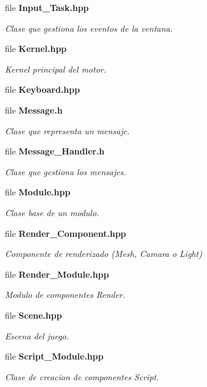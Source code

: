 \begin{DoxyCompactItemize}
file \textbf{ Input\+\_\+\+Task.\+hpp}
\begin{DoxyCompactList}\small\item\em Clase que gestiona los eventos de la ventana. \end{DoxyCompactList}\item 
file \textbf{ Kernel.\+hpp}
\begin{DoxyCompactList}\small\item\em Kernel principal del motor. \end{DoxyCompactList}\item 
file \textbf{ Keyboard.\+hpp}
\item 
file \textbf{ Message.\+h}
\begin{DoxyCompactList}\small\item\em Clase que representa un mensaje. \end{DoxyCompactList}\item 
file \textbf{ Message\+\_\+\+Handler.\+h}
\begin{DoxyCompactList}\small\item\em Clase que gestiona los mensajes. \end{DoxyCompactList}\item 
file \textbf{ Module.\+hpp}
\begin{DoxyCompactList}\small\item\em Clase base de un modulo. \end{DoxyCompactList}\item 
file \textbf{ Render\+\_\+\+Component.\+hpp}
\begin{DoxyCompactList}\small\item\em Componente de renderizado (Mesh, Camara o Light) \end{DoxyCompactList}\item 
file \textbf{ Render\+\_\+\+Module.\+hpp}
\begin{DoxyCompactList}\small\item\em Modulo de componentes Render. \end{DoxyCompactList}\item 
file \textbf{ Scene.\+hpp}
\begin{DoxyCompactList}\small\item\em Escena del juego. \end{DoxyCompactList}\item 
file \textbf{ Script\+\_\+\+Module.\+hpp}
\begin{DoxyCompactList}\small\item\em Clase de creacion de componentes Script. \end{DoxyCompactList}\item 

\end{DoxyCompactItemize}
